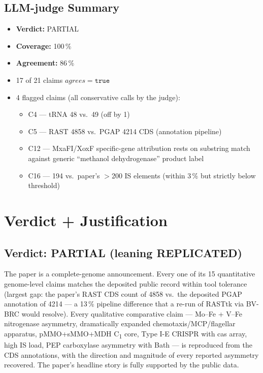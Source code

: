 \documentclass[11pt]{article}
\begin{document}
\subsection{LLM-judge Summary}
\begin{itemize}
  \item \textbf{Verdict:} PARTIAL
  \item \textbf{Coverage:} 100\,\%
  \item \textbf{Agreement:} 86\,\%
  \item 17 of 21 claims $agrees=\mathtt{true}$
  \item 4 flagged claims (all conservative calls by the judge):
    \begin{itemize}
      \item C4 --- tRNA 48 vs.\ 49 (off by 1)
      \item C5 --- RAST 4858 vs.\ PGAP 4214 CDS (annotation pipeline)
      \item C12 --- MxaFI/XoxF specific-gene attribution rests on substring
        match against generic ``methanol dehydrogenase'' product label
      \item C16 --- 194 vs.\ paper's $>$200 IS elements (within 3\,\% but
        strictly below threshold)
    \end{itemize}
\end{itemize}

\section{Verdict + Justification}
\subsection*{Verdict: PARTIAL (leaning REPLICATED)}
The paper is a complete-genome announcement. Every one of its 15
quantitative genome-level claims matches the deposited public record within
tool tolerance (largest gap: the paper's RAST CDS count of 4858 vs.\ the
deposited PGAP annotation of 4214 --- a 13\,\% pipeline difference that a
re-run of RASTtk via BV-BRC would resolve). Every qualitative comparative
claim --- Mo--Fe + V--Fe nitrogenase asymmetry, dramatically expanded
chemotaxis/MCP/flagellar apparatus, pMMO+sMMO+MDH C\textsubscript{1} core,
Type I-E CRISPR with cas array, high IS load, PEP carboxylase asymmetry
with Bath --- is reproduced from the CDS annotations, with the direction and
magnitude of every reported asymmetry recovered. The paper's headline story
is fully supported by the public data.
\end{document}

